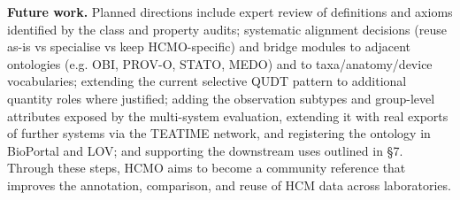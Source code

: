 \textbf{Future work.} Planned directions include expert review of definitions and axioms identified by the class and property audits; systematic alignment decisions (reuse as-is vs specialise vs keep HCMO-specific) and bridge modules to adjacent ontologies (e.g. OBI, PROV-O, STATO, MEDO) and to taxa/anatomy/device vocabularies; extending the current selective QUDT pattern to additional quantity roles where justified; adding the observation subtypes and group-level attributes exposed by the multi-system evaluation, extending it with real exports of further systems via the TEATIME network, and registering the ontology in BioPortal and LOV; and supporting the downstream uses outlined in \S{}7. Through these steps, HCMO aims to become a community reference that improves the annotation, comparison, and reuse of HCM data across laboratories.
